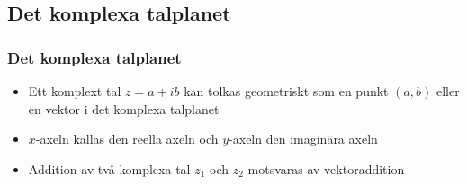 \documentclass[slidestop,blue,handout,9pt]{beamer}
\begin{document}
\subsection{Det komplexa talplanet}
\begin{frame}
\frametitle{Det komplexa talplanet}

\begin{itemize}
 \item Ett komplext tal $z=a+ib$ kan tolkas geometriskt som en punkt
  $(a,b)$ eller en vektor i \alert{det komplexa talplanet}
\item $x$-axeln kallas \alert{den reella axeln} och $y$-axeln \alert{den
   imaginära axeln}
\item Addition av två komplexa tal $z_1$ och $z_2$ motsvaras av vektoraddition
\end{itemize}
\vspace{0.3cm}

\begin{minipage}{\textwidth}
\end{minipage}

\vspace{0.2cm}

\end{frame}
\end{document}
